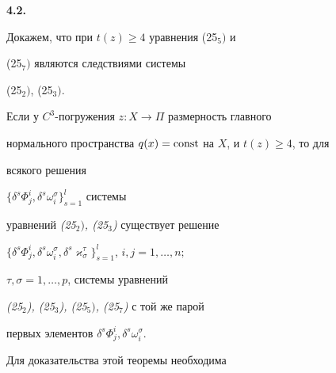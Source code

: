 {\bf 4.2.}


Докажем, что при $t(z)\ge 4$ уравнения (25${}_5)$ и


(25${}_7)$ являются следствиями системы


(25${}_2)$, (25${}_3)$.





\begin{thm}


Если у $C^3$-погружения $z:X\to\Pi$ размерность главного


нормального пространства $q(x)=\operatorname{const}$ на $X$, и $t(z)\ge 4$, то для


всякого решения


$\{\delta^s\Phi^i_j,\delta^s\omega^{\sigma}_i\}_{s=1}^l$ системы


уравнений {\em (25${}_2)$, (25${}_3$)} существует решение


$\{\delta^s\Phi^i_j,\delta^s\omega^{\sigma}_i,


\delta^s\varkappa^{\tau}_{\sigma}\}_{s=1}^l$,  $i,j=1,\dotsc,n;$


$\tau,\sigma=1,\dotsc,p$, системы уравнений


{\em (25${}_2$), (25${}_3$), (25${}_5)$, (25${}_7$)} с той же парой


первых элементов $\delta^s\Phi^i_j,\delta^s\omega^{\sigma}_i$.


\end{thm}





Для доказательства этой теоремы необходима





